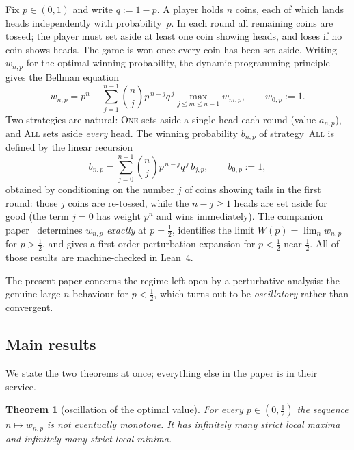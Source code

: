 \documentclass[11pt]{article}
\newtheorem{theorem}{Theorem}[section]
\theoremstyle{definition}
\newcommand{\One}{\textsc{One}}
\newcommand{\All}{\textsc{All}}
\begin{document}
Fix $p\in(0,1)$ and write $q:=1-p$. A player holds $n$ coins, each of
which lands heads independently with probability~$p$. In each round
all remaining coins are tossed; the player must set aside at least one
coin showing heads, and loses if no coin shows heads. The game is won
once every coin has been set aside. Writing $w_{n,p}$ for the optimal
winning probability, the dynamic-programming principle gives the
Bellman equation
\begin{equation}\label{eq:bellman}
  w_{n,p}=p^{n}+\sum_{j=1}^{n-1}\binom{n}{j}p^{\,n-j}q^{\,j}
          \max_{j\le m\le n-1}w_{m,p},\qquad w_{0,p}:=1 .
\end{equation}
Two strategies are natural: \One{} sets aside a single head each round
(value $a_{n,p}$), and \All{} sets aside \emph{every} head. The
winning probability $b_{n,p}$ of strategy~\All{} is defined by the
linear recursion
\begin{equation}\label{eq:brec}
  b_{n,p}=\sum_{j=0}^{n-1}\binom{n}{j}p^{\,n-j}q^{\,j}\,b_{j,p},
  \qquad b_{0,p}:=1,
\end{equation}
obtained by conditioning on the number $j$ of coins showing tails in
the first round: those $j$ coins are re-tossed, while the $n-j\ge1$
heads are set aside for good (the term $j=0$ has weight $p^{n}$ and
wins immediately). The companion paper~\cite{Paper1} determines
$w_{n,p}$
\emph{exactly} at $p=\tfrac12$, identifies the limit
$W(p)=\lim_n w_{n,p}$ for $p>\tfrac12$, and gives a first-order
perturbation expansion for $p<\tfrac12$ near $\tfrac12$. All of those
results are machine-checked in Lean~4.

The present paper concerns the regime left open by a perturbative
analysis: the genuine large-$n$ behaviour for $p<\tfrac12$, which
turns out to be \emph{oscillatory} rather than convergent.

\subsection{Main results}\label{sec:main}

We state the two theorems at once; everything else in the paper is in
their service.

\begin{theorem}[oscillation of the optimal value]\label{thm:main}
  For every $p\in(0,\tfrac12)$ the sequence $n\mapsto w_{n,p}$ is not
  eventually monotone. It has infinitely many strict local maxima and
  infinitely many strict local minima.
\end{theorem}
\end{document}
